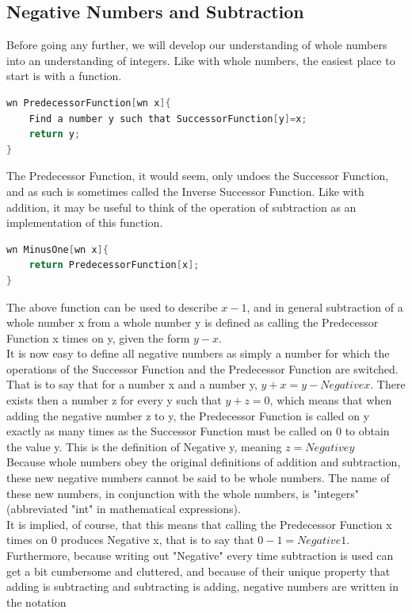 \subsection{Negative Numbers and Subtraction}
Before going any further, we will develop our understanding of whole numbers into an understanding of integers. Like with whole numbers, the easiest place to start is with a function.
\begin{center}
\begin{lstlisting}[language=C,caption=The Predecessor Function,label=lst:predFunc]
wn PredecessorFunction[wn x]{
	Find a number y such that SuccessorFunction[y]=x;
	return y;
}
\end{lstlisting}
\end{center}
The Predecessor Function, it would seem, only undoes the Successor Function, and as such is sometimes called the Inverse Successor Function. Like with addition, it may be useful to think of the operation of subtraction as an implementation of this function.
\begin{center}
\begin{lstlisting}[language=C,caption=Minus One Function,label=lst:minusOneFunc]
wn MinusOne[wn x]{
	return PredecessorFunction[x];
}
\end{lstlisting}
\end{center}
The above function can be used to describe $x-1$, and in general subtraction of a whole number x from a whole number y is defined as calling the Predecessor Function x times on y, given the form $y-x$. \\
It is now easy to define all negative numbers as simply a number for which the operations of the Successor Function and the Predecessor Function are switched. That is to say that for a number x and a number y, $y+x=y- Negative x$. There exists then a number z for every y such that $y+z=0$, which means that when adding the negative number z to y, the Predecessor Function is called on y exactly as many times as the Successor Function must be called on $0$ to obtain the value y. This is the definition of Negative y, meaning $z=Negative y$ \\
Because whole numbers obey the original definitions of addition and subtraction, these new negative numbers cannot be said to be whole numbers. The name of these new numbers, in conjunction with the whole numbers, is "integers" (abbreviated "int" in mathematical expressions). \\
It is implied, of course, that this means that calling the Predecessor Function x times on $0$ produces Negative x, that is to say that $0-1=Negative 1$. Furthermore, because writing out "Negative" every time subtraction is used can get a bit cumbersome and cluttered, and because of their unique property that adding is subtracting and subtracting is adding, negative numbers are written in the notation
